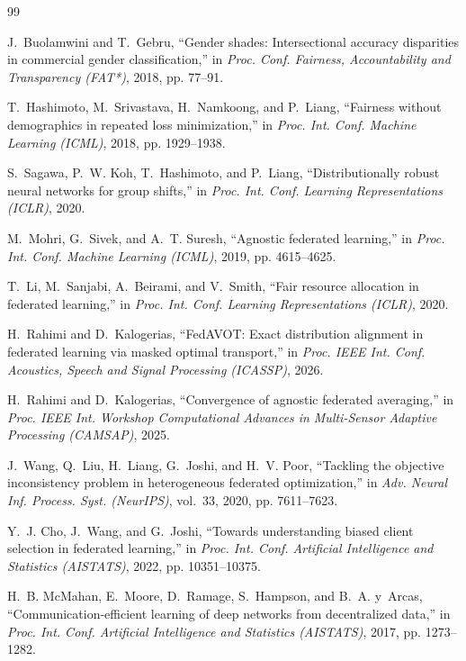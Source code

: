 \documentclass{article}
\theoremstyle{definition}
\begin{document}
\begin{thebibliography}{99}\setlength{\itemsep}{-1pt}\small

J.~Buolamwini and T.~Gebru, ``Gender shades: Intersectional accuracy disparities
in commercial gender classification,'' in \emph{Proc. Conf. Fairness,
Accountability and Transparency (FAT*)}, 2018, pp. 77--91.

T.~Hashimoto, M.~Srivastava, H.~Namkoong, and P.~Liang, ``Fairness without
demographics in repeated loss minimization,'' in \emph{Proc. Int. Conf. Machine
Learning (ICML)}, 2018, pp. 1929--1938.

S.~Sagawa, P.~W. Koh, T.~Hashimoto, and P.~Liang, ``Distributionally robust
neural networks for group shifts,'' in \emph{Proc. Int. Conf. Learning
Representations (ICLR)}, 2020.

M.~Mohri, G.~Sivek, and A.~T. Suresh, ``Agnostic federated learning,'' in
\emph{Proc. Int. Conf. Machine Learning (ICML)}, 2019, pp. 4615--4625.

T.~Li, M.~Sanjabi, A.~Beirami, and V.~Smith, ``Fair resource allocation in
federated learning,'' in \emph{Proc. Int. Conf. Learning Representations
(ICLR)}, 2020.

H.~Rahimi and D.~Kalogerias, ``FedAVOT: Exact distribution alignment in
federated learning via masked optimal transport,'' in \emph{Proc. IEEE Int.
Conf. Acoustics, Speech and Signal Processing (ICASSP)}, 2026.

H.~Rahimi and D.~Kalogerias, ``Convergence of agnostic federated averaging,''
in \emph{Proc. IEEE Int. Workshop Computational Advances in Multi-Sensor
Adaptive Processing (CAMSAP)}, 2025.

J.~Wang, Q.~Liu, H.~Liang, G.~Joshi, and H.~V. Poor, ``Tackling the objective
inconsistency problem in heterogeneous federated optimization,'' in \emph{Adv.
Neural Inf. Process. Syst. (NeurIPS)}, vol.~33, 2020, pp. 7611--7623.

Y.~J. Cho, J.~Wang, and G.~Joshi, ``Towards understanding biased client
selection in federated learning,'' in \emph{Proc. Int. Conf. Artificial
Intelligence and Statistics (AISTATS)}, 2022, pp. 10351--10375.

H.~B. McMahan, E.~Moore, D.~Ramage, S.~Hampson, and B.~A. y~Arcas,
``Communication-efficient learning of deep networks from decentralized data,''
in \emph{Proc. Int. Conf. Artificial Intelligence and Statistics (AISTATS)},
2017, pp. 1273--1282.


\end{thebibliography}
\end{document}

